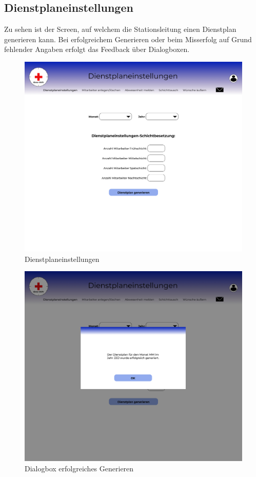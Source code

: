 \documentclass[11pt,
paper=a4,
bibtotocnumbered,	  %
liststotocnumbered,  %
DIV=calc,		  %
tablecaptionabove,	  %
headinclude,
]{article}
\begin{document}
\subsection{Dienstplaneinstellungen}
Zu sehen ist der Screen, auf welchem die Stationsleitung einen Dienstplan generieren kann. Bei erfolgreichem Generieren oder beim Misserfolg auf Grund fehlender Angaben erfolgt das Feedback über Dialogboxen.
\begin{figure}[H]
\includegraphics[width=1\textwidth]{Bilder/Screens/Dienstplaneinstellungen.jpg}{\centering}
\caption{Dienstplaneinstellungen}
\end{figure}
\begin{figure}[H]
\includegraphics[width=1\textwidth]{Bilder/Screens/Dienstplaneinstellungen-Dialogbox.jpg}{\centering}
\caption{Dialogbox erfolgreiches Generieren}
\end{figure}
\end{document}
